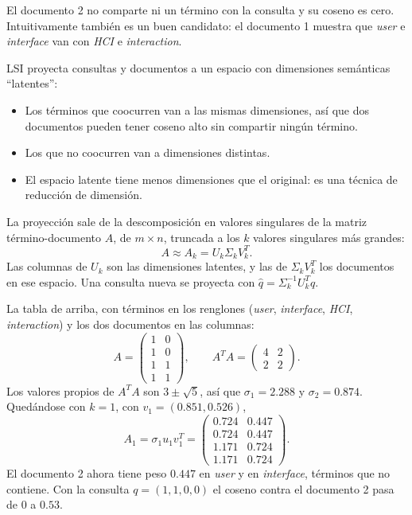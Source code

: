 \documentclass[11pt,letterpaper]{article}
\begin{document}
El documento 2 no comparte ni un término con la consulta y su coseno
es cero. Intuitivamente también es un buen candidato: el documento 1
muestra que \textit{user} e \textit{interface} van con \textit{HCI} e
\textit{interaction}.

LSI proyecta consultas y documentos a un espacio con dimensiones
semánticas ``latentes'':

\begin{itemize}[itemsep=0.3em]
    \item Los términos que coocurren van a las mismas dimensiones, así
          que dos documentos pueden tener coseno alto sin compartir
          ningún término.
    \item Los que no coocurren van a dimensiones distintas.
    \item El espacio latente tiene menos dimensiones que el original:
          es una técnica de reducción de dimensión.
\end{itemize}

La proyección sale de la descomposición en valores singulares de la
matriz término-documento $A$, de $m \times n$, truncada a los $k$
valores singulares más grandes:
\[
    A \approx A_k = U_k \Sigma_k V_k^{T} .
\]
Las columnas de $U_k$ son las dimensiones latentes, y las de
$\Sigma_k V_k^{T}$ los documentos en ese espacio. Una consulta nueva
se proyecta con $\hat{q} = \Sigma_k^{-1} U_k^{T} q$.

\begin{ejemplo}
    La tabla de arriba, con términos en los renglones
    (\textit{user}, \textit{interface}, \textit{HCI},
    \textit{interaction}) y los dos documentos en las columnas:
    \[
        A = \begin{pmatrix} 1 & 0 \\ 1 & 0 \\ 1 & 1 \\ 1 & 1
            \end{pmatrix},
        \qquad
        A^{T} A = \begin{pmatrix} 4 & 2 \\ 2 & 2 \end{pmatrix} .
    \]
    Los valores propios de $A^{T}A$ son $3 \pm \sqrt{5}$, así que
    $\sigma_1 = 2.288$ y $\sigma_2 = 0.874$. Quedándose con $k = 1$,
    con $v_1 = (0.851, 0.526)$,
    \[
        A_1 = \sigma_1 u_1 v_1^{T}
            = \begin{pmatrix}
                0.724 & 0.447 \\ 0.724 & 0.447 \\
                1.171 & 0.724 \\ 1.171 & 0.724
              \end{pmatrix} .
    \]
    El documento 2 ahora tiene peso $0.447$ en \textit{user} y en
    \textit{interface}, términos que no contiene. Con la consulta
    $q = (1,1,0,0)$ el coseno contra el documento 2 pasa de $0$ a
    $0.53$.
\end{ejemplo}
\end{document}
